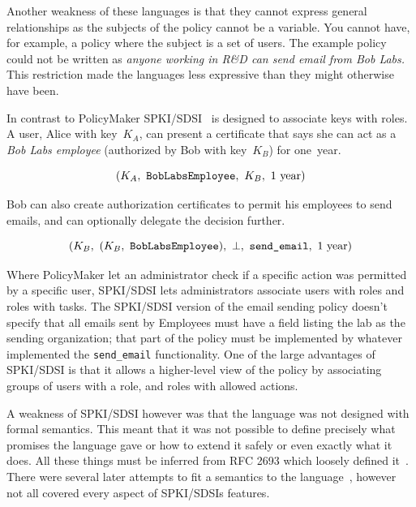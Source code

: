 \documentclass[thesis.tex]{subfiles}
\begin{document}
Another weakness of these languages is that they cannot express
general relationships as the subjects of the policy cannot be a
variable.  You cannot have, for example, a policy where the subject is
a set of users.  The example policy could not be written as
\emph{anyone working in R\&D can send email from Bob Labs.}  This
restriction made the languages less expressive than they might
otherwise have been.


In contrast to PolicyMaker SPKI/SDSI~\cite{ellison_spki_1999} is
designed to associate keys with roles.  A user, Alice with key~$K_A$,
can present a certificate that says she can act as a \emph{Bob Labs
employee} (authorized by Bob with key~$K_B$) for one~year.

\begin{equation*}
  (K_A,~\text{\tt BobLabsEmployee},~K_B,~1~\text{year})
\end{equation*}

Bob can also create authorization certificates to permit his employees
to send emails, and can optionally delegate the decision further.

\begin{equation*}
 (K_B,~(K_B,~\text{\tt BobLabsEmployee}),~\bot,~\text{\ttfamily send\_email},~1~\text{year})
\end{equation*}

Where PolicyMaker let an administrator check if a specific action was
permitted by a specific user, SPKI/SDSI lets administrators associate
users with roles and roles with tasks.  The SPKI/SDSI version of the
email sending policy doesn't specify that all emails sent by Employees
must have a field listing the lab as the sending organization; that
part of the policy must be implemented by whatever implemented the
\texttt{send\_email} functionality.  One of the large advantages of
SPKI/SDSI is that it allows a higher-level view of the policy by
associating groups of users with a role, and roles with allowed
actions.

A weakness of SPKI/SDSI however was that the language was not designed
with formal semantics.  This meant that it was not possible to define
precisely what promises the language gave or how to extend it safely
or even exactly what it does.  All these things must be inferred from
RFC 2693 which loosely defined it~\cite{ellison_spki_1999}. There were
several later attempts to fit a semantics to the
language~\cite{joseph_y._halpern_logic_1999,abadi_sdsis_1998,howell_formal_2000},
however not all covered every aspect of SPKI/SDSIs features.
\end{document}
